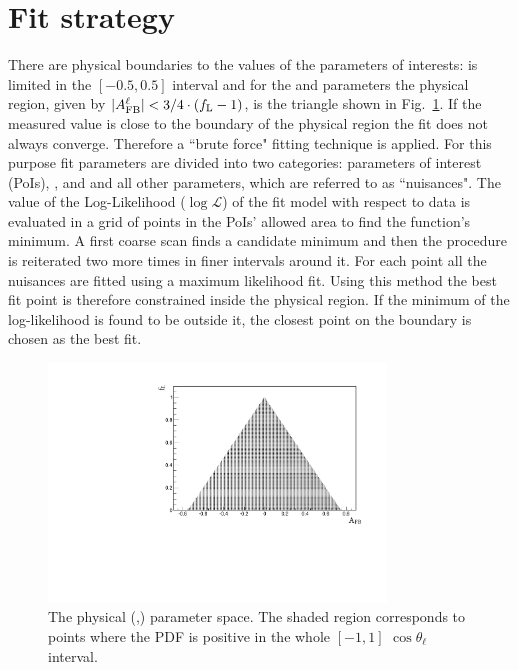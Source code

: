 \section{Fit strategy}

There are physical boundaries to the values of the parameters of interests:
\afbh is limited in the $[-0.5,0.5]$ interval and for the \fl and 
\afbl parameters the physical region, given by $| A_{\rm FB}^\ell | < 3/4 \cdot (f_{\rm L}-1)$,
is the triangle shown in Fig.~\ref{fig:pdfscan}.
If the measured value is close to the boundary of the physical region the fit does not always converge. 
Therefore a ``brute force" fitting technique is applied. For this purpose fit parameters are
divided into two categories: parameters of interest (PoIs), \afbl,
\afbh and \fl and all other parameters, which are referred to as ``nuisances".
The value of the Log-Likelihood ($\log\mathcal{L}$) of the fit model with respect to data 
is evaluated in a grid of points in the PoIs' allowed area to find the function's minimum.
A first coarse scan finds a candidate minimum and then the procedure is reiterated two
more times in finer intervals around it. For each point all the nuisances are fitted
using a maximum likelihood fit. Using this method the best fit point is therefore constrained inside
the physical region. If the minimum of the log-likelihood is found to be outside it, the closest point on
the boundary is chosen as the best fit. %

\begin{figure}[h!]
\centering
\includegraphics[width=0.8\textwidth]{Lmumu/figs/scan.pdf}
\caption{The physical (\afbl,\fl) parameter space. The shaded region corresponds 
to points where the PDF is positive in the whole $[-1,1]$ $\cos\theta_\ell$ interval. }
\label{fig:pdfscan}
\end{figure}



